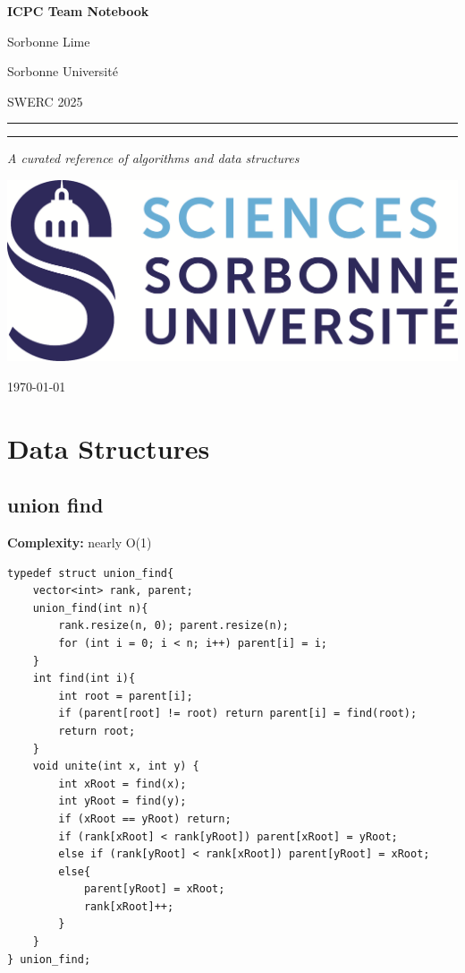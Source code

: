 \documentclass[10pt,a4paper]{article}
\begin{document}
\begin{titlepage}
  \centering

  \vspace*{2cm}
  {\Huge\bfseries ICPC Team Notebook\par}
  \vspace{1cm}

  {\Large {Sorbonne Lime}\par}
  {\Large {Sorbonne Université}\par}
  {\Large SWERC 2025\par}
  \vspace{1.5cm}

  \rule{\linewidth}{1.5pt}\par
  \vspace{0.5cm}
  \rule{\linewidth}{0.5pt}\par
  \vspace{1.5cm}

  {\LARGE \itshape A curated reference of algorithms and data structures\par}
  \vspace{1cm}

  \includegraphics[width=0.2 \textwidth]{img/logo.png}\par
  \vspace{1cm}

  {\large \today\par}

  \clearpage
\end{titlepage}


\clearpage
\tableofcontents

\twocolumn

\section{Data Structures}

\subsection{union find}

\textbf{Complexity:} nearly O(1) \\
\begin{verbatim}
typedef struct union_find{
    vector<int> rank, parent;
    union_find(int n){
        rank.resize(n, 0); parent.resize(n);
        for (int i = 0; i < n; i++) parent[i] = i;
    }
    int find(int i){
        int root = parent[i];
        if (parent[root] != root) return parent[i] = find(root);
        return root;
    }
    void unite(int x, int y) {
        int xRoot = find(x);
        int yRoot = find(y);
        if (xRoot == yRoot) return;
        if (rank[xRoot] < rank[yRoot]) parent[xRoot] = yRoot;
        else if (rank[yRoot] < rank[xRoot]) parent[yRoot] = xRoot;
        else{
            parent[yRoot] = xRoot;
            rank[xRoot]++;
        }
    }
} union_find;
\end{verbatim}
\end{document}
